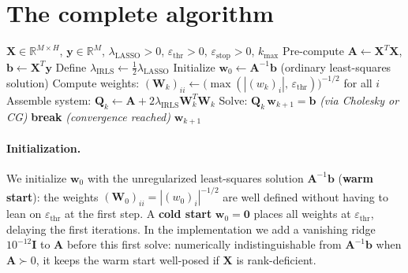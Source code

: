 \section{The complete algorithm}
\label{sec:irls_algorithm}

\begin{algorithm}[H]
    \caption{Iteratively Reweighted Least Squares (IRLS)}
    \label{alg:irls}
    \begin{algorithmic}[1]
        \Require $\mathbf{X} \in \mathbb{R}^{M \times H}$, $\mathbf{y} \in \mathbb{R}^M$,
        $\lambda_{\text{LASSO}} > 0$, $\varepsilon_{\mathrm{thr}} > 0$, $\varepsilon_{\mathrm{stop}} > 0$,
        $k_{\max}$
        \State Pre-compute $\mathbf{A} \leftarrow \mathbf{X}^T\mathbf{X}$,
        $\mathbf{b} \leftarrow \mathbf{X}^T\mathbf{y}$
        \State Define $\lambda_{\text{IRLS}} \leftarrow \frac{1}{2}\lambda_{\text{LASSO}}$
        \State Initialize $\mathbf{w}_0 \leftarrow \mathbf{A}^{-1}\mathbf{b}$
        (ordinary least-squares solution)
            \State Compute weights: $(\mathbf{W}_k)_{ii} \leftarrow
            \bigl(\max(|(w_k)_i|,\, \varepsilon_{\mathrm{thr}})\bigr)^{-1/2}$ for all $i$
            \State Assemble system: $\mathbf{Q}_k \leftarrow \mathbf{A}
            + 2\lambda_{\text{IRLS}}\mathbf{W}_k^T\mathbf{W}_k$
            \State Solve: $\mathbf{Q}_k\,\mathbf{w}_{k+1} = \mathbf{b}$
            \quad \textit{(via Cholesky or CG)}
                \State \textbf{break} \quad \textit{(convergence reached)}
            \EndIf
        \EndFor
        \State \Return $\mathbf{w}_{k+1}$
    \end{algorithmic}
\end{algorithm}

\paragraph{Initialization.} We initialize $\mathbf{w}_0$ with the unregularized least-squares solution $\mathbf{A}^{-1}\mathbf{b}$ (\textbf{warm start}): the weights $(\mathbf{W}_0)_{ii} = |(w_0)_i|^{-1/2}$ are well defined without having to lean on $\varepsilon_{\mathrm{thr}}$ at the first step. A \textbf{cold start} $\mathbf{w}_0 = \mathbf{0}$ places all weights at $\varepsilon_{\mathrm{thr}}$, delaying the first iterations. In the implementation we add a vanishing ridge $10^{-12}\mathbf{I}$ to $\mathbf{A}$ before this first solve: numerically indistinguishable from $\mathbf{A}^{-1}\mathbf{b}$ when $\mathbf{A} \succ 0$, it keeps the warm start well-posed if $\mathbf{X}$ is rank-deficient.

